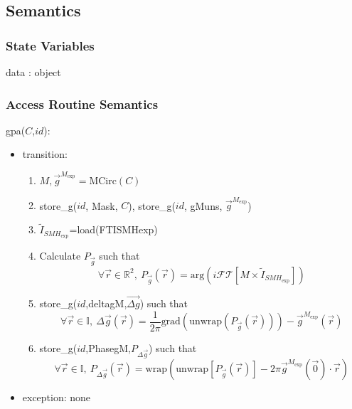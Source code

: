 \documentclass[12pt, titlepage]{article}
\begin{document}
\subsection{Semantics}

\subsubsection{State Variables}

data : object

\subsubsection{Access Routine Semantics}

\noindent gpa($C$,$id$):
\begin{itemize} 
\item transition: 
	\begin{enumerate}
	\item $M,\overrightarrow{g}^{M_{\text{exp}}}=\text{MCirc}(C)$
	\item store{\_}g($id$, Mask, $C$), store{\_}g($id$, gMuns, 
$\overrightarrow{g}^{M_{\text{exp}}}$)
	\item $\widetilde{I}_{\mathit{SMH}_{\text{exp}}}$=load(FTISMHexp)
	\item Calculate $P_{\vec{g}}$ such that
	\begin{equation*}
	\forall \vec{r} \in \mathbb{R}^2, \ 
P_{\vec{g}}(\vec{r})=\text{arg}(i\mathcal{FT}[M\times\widetilde{I}_{\mathit{SMH}_{\text{exp}}}])
	\end{equation*}
	\item store{\_}g($id$,deltagM,$\overrightarrow{\Delta g}$) such that
	\begin{equation*}
	\forall \vec{r} \in \mathbb{I}, \ \Delta 
\overrightarrow{g}(\vec{r})=\frac{1}{2\pi}\text{grad}(\text{unwrap}(P_{\vec{g}}(\vec{r})))-\overrightarrow{g}^{M_{\text{exp}}}(\vec{r})
	\end{equation*}
	\item store{\_}g($id$,PhasegM,$P_{\Delta \vec{g}}$) such that
	\begin{equation*}
	\forall \vec{r} \in \mathbb{I}, \ P_{\Delta 
\vec{g}}(\vec{r})=\text{wrap}(\text{unwrap}[P_{\vec{g}}(\vec{r})]-2\pi\overrightarrow{g}^{M_{\text{exp}}}(\vec{0})\cdot 
\vec{r})
	\end{equation*}
	\end{enumerate}
\item exception: none
\end{itemize}
\end{document}

